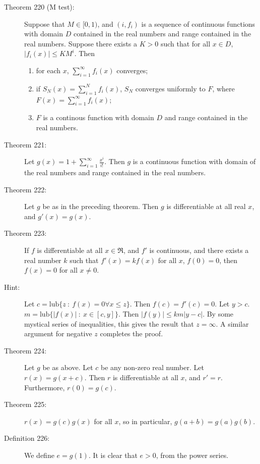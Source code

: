 \documentclass{article}
\begin{document}
\begin{description}
  \item[Theorem 220 (M test):] Suppose that $M \in [0,1)$, and $(i, f_{i})$ is a sequence of continuous functions with domain $D$ contained in the real numbers and range contained in the real numbers. Suppose there exists a $K > 0$ such that for all $x \in D$, $|f_{i}(x)| \leq KM^{i}$. Then
    \begin{enumerate}
      \item for each $x$, $\displaystyle \sum_{i=1}^{\infty} f_{i}(x)$ converges; 
      \item if $\displaystyle S_{N}(x) = \sum_{i=1}^{N} f_{i}(x)$, $S_{N}$ converges uniformly to $F$, where $\displaystyle F(x) = \sum_{i=1}^{\infty} f_{i}(x)$;
      \item $F$ is a continous function with domain $D$ and range contained in the real numbers.
    \end{enumerate}

  \item[Theorem 221:] Let $\displaystyle g(x) = 1 + \sum_{i=1}^{\infty} \frac{x^{i}}{i!}$. Then $g$ is a continuous function with domain of the real numbers and range contained in the real numbers. 

  \item[Theorem 222:] Let $g$ be as in the preceding theorem. Then $g$ is differentiable at all real $x$, and $g' (x) = g(x)$.

  \item[Theorem 223:] If $f$ is differentiable at all $x \in \Re$, and $f'$ is continuous, and there exists a real number $k$ such that $f' (x) = kf(x)$ for all $x$, $f(0) = 0$, then $f(x) = 0$ for all $x \neq 0$. 

  \item[Hint:] Let $c = \text{lub} \{ z\ :\ f(x)=0 \forall x \leq z \}$. Then $f(c) = f' (c) =0$. Let $y > c$. $m = \text{lub} \{ |f(x)|\ :\ x \in [c,y] \}$. Then $|f(y)| \leq km |y-c|$. By some mystical series of inequalities, this gives the result that $z = \infty$. A similar argument for negative $z$ completes the proof.

  \item[Theorem 224:] Let $g$ be as above. Let $c$ be any non-zero real number. Let $r(x) = g(x+c)$. Then $r$ is differentiable at all $x$, and $r' = r$. Furthermore, $r(0) = g(c)$. 

  \item[Theorem 225:] $r(x) = g(c) g(x)$ for all $x$, so in particular, $g(a+b) = g(a) g(b)$. 

  \item[Definition 226:] We define $e = g(1)$. It is clear that $e > 0$, from the power series.


\end{description}
\end{document}
